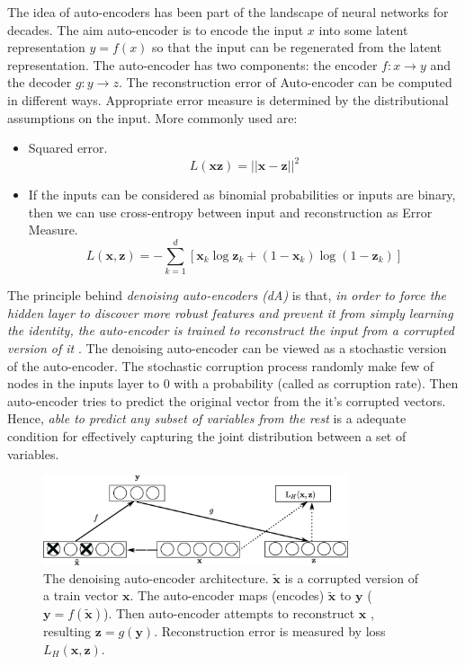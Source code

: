 The idea of auto-encoders has been part of the landscape of neural networks for decades. The aim auto-encoder is to encode the input $x$ into some latent representation $y = f(x)$ so that the input can be regenerated from the latent representation. The auto-encoder has two components: the encoder $f:x \rightarrow y$ and the decoder $g:y\rightarrow z$. The reconstruction error of Auto-encoder can be computed in different ways. Appropriate error measure is determined by the distributional assumptions on the input. More commonly used are:
\begin{itemize}
\item Squared error.
$$ L(\mathbf{x} \mathbf{z}) = || \mathbf{x} - \mathbf{z} ||^2$$
\item If the inputs can be considered as binomial probabilities or inputs are binary, then we can use cross-entropy between input and reconstruction as Error Measure.
$$L(\mathbf{x}, \mathbf{z}) = - \sum^d_{k=1}[\mathbf{x}_k \log \mathbf{z}_k + (1 - \mathbf{x}_k)\log(1 - \mathbf{z}_k)]$$
\end{itemize}

The principle behind \emph{denoising auto-encoders (dA)} is that, \textit{in order to force the hidden layer to discover more robust features and prevent it from simply learning the identity, the auto-encoder is trained to reconstruct the input from a corrupted version of it} \cite{vincent2008extracting}. The denoising auto-encoder can be viewed as a stochastic version of the auto-encoder. The stochastic corruption process randomly make few of nodes in the inputs layer to $0$ with a probability (called as corruption rate). Then auto-encoder tries to predict the original vector from the it's corrupted vectors. Hence, \textit{able to predict any subset of variables from the rest} is a adequate condition for effectively capturing the joint distribution between a set of variables.

\begin{figure}[ht]
\centering
\includegraphics[width=0.8\textwidth]{./imgs/sda.eps}
\caption[The denoising auto-encoder architecture]{The denoising auto-encoder architecture. $\mathbf{\tilde{x}}$ is a corrupted version of a train vector $\mathbf{x}$. The auto-encoder maps (encodes) $\mathbf{\tilde{x}}$ to $\mathbf{y}$ ($\mathbf{y} = f(\mathbf{\tilde{x}})$). Then auto-encoder attempts to reconstruct $\mathbf{x}$ , resulting $ \mathbf{z} = g(\mathbf{y}) $. Reconstruction error is measured by loss $L_{H}(\mathbf{x},\mathbf{z})$. }
\label{fig:sdaChain}
\end{figure}

